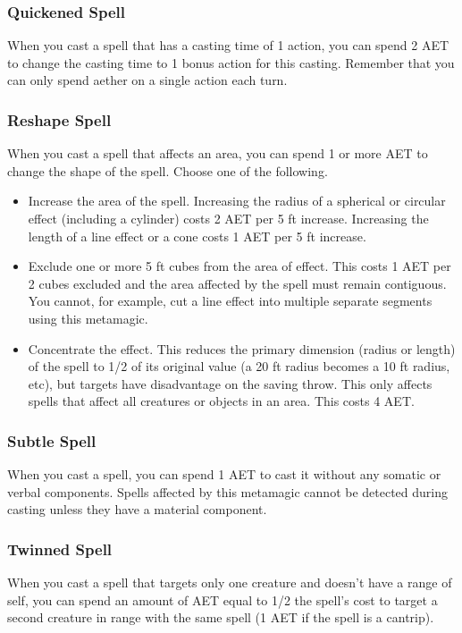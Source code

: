 \subsubsection{Quickened Spell}

When you cast a spell that has a casting time of 1 action, you can spend 2 AET to change the casting time to 1 bonus action for this casting. Remember that you can only spend aether on a single action each turn.

\subsubsection{Reshape Spell}
When you cast a spell that affects an area, you can spend 1 or more AET to change the shape of the spell. Choose one of the following.
\begin{itemize}
  \item Increase the area of the spell. Increasing the radius of a spherical or circular effect (including a cylinder) costs 2 AET per 5 ft increase. Increasing the length of a line effect or a cone costs 1 AET per 5 ft increase.
  \item Exclude one or more 5 ft cubes from the area of effect. This costs 1 AET per 2 cubes excluded and the area affected by the spell must remain contiguous. You cannot, for example, cut a line effect into multiple separate segments using this metamagic.
  \item Concentrate the effect. This reduces the primary dimension (radius or length) of the spell to 1/2 of its original value (a 20 ft radius becomes a 10 ft radius, etc), but targets have disadvantage on the saving throw. This only affects spells that affect all creatures or objects in an area. This costs 4 AET.
\end{itemize}

\subsubsection{Subtle Spell}

When you cast a spell, you can spend 1 AET to cast it without any somatic or verbal components. Spells affected by this metamagic cannot be detected during casting unless they have a material component.

\subsubsection{Twinned Spell}

When you cast a spell that targets only one creature and doesn't have a range of self, you can spend an amount of AET equal to 1/2 the spell's cost to target a second creature in range with the same spell (1 AET if the spell is a cantrip).

